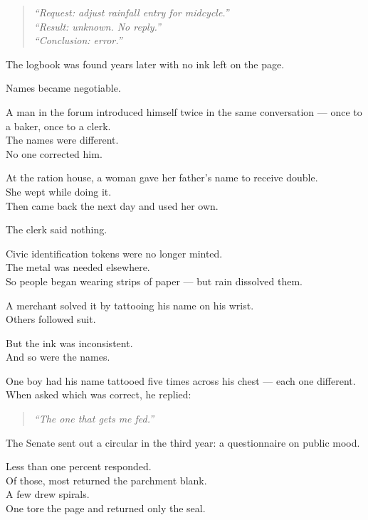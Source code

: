 \documentclass[12pt]{article}
\begin{document}
\begin{quote}
\textit{“Request: adjust rainfall entry for midcycle.”}\\
\textit{“Result: unknown. No reply.”}\\
\textit{“Conclusion: error.”}
\end{quote}

The logbook was found years later with no ink left on the page.

\vspace{1em}

Names became negotiable.

A man in the forum introduced himself twice in the same conversation — once to a baker, once to a clerk.\\
The names were different.\\
No one corrected him.

At the ration house, a woman gave her father’s name to receive double.\\
She wept while doing it.\\
Then came back the next day and used her own.

The clerk said nothing.

\vspace{1em}

Civic identification tokens were no longer minted.\\
The metal was needed elsewhere.\\
So people began wearing strips of paper — but rain dissolved them.

A merchant solved it by tattooing his name on his wrist.\\
Others followed suit.

But the ink was inconsistent.\\
And so were the names.

One boy had his name tattooed five times across his chest — each one different.\\
When asked which was correct, he replied:

\begin{quote}
\textit{“The one that gets me fed.”}
\end{quote}

\vspace{1em}

The Senate sent out a circular in the third year: a questionnaire on public mood.

Less than one percent responded.\\
Of those, most returned the parchment blank.\\
A few drew spirals.\\
One tore the page and returned only the seal.
\end{document}
